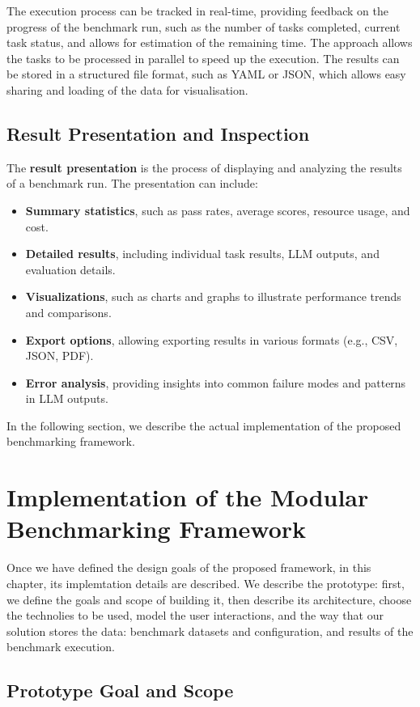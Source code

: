 The execution process can be tracked in real-time, providing feedback on the progress of the benchmark run, such as the number of tasks completed, current task status, and allows for estimation of the remaining time.
The approach allows the tasks to be processed in parallel to speed up the execution.
The results can be stored in a structured file format, such as YAML or JSON, which allows easy sharing and loading of the data for visualisation.

\subsection{Result Presentation and Inspection}
The \textbf{result presentation} is the process of displaying and analyzing the results of a benchmark run.
The presentation can include:
\begin{itemize}
    \item \textbf{Summary statistics}, such as pass rates, average scores, resource usage, and cost.
    \item \textbf{Detailed results}, including individual task results, LLM outputs, and evaluation details.
    \item \textbf{Visualizations}, such as charts and graphs to illustrate performance trends and comparisons.
    \item \textbf{Export options}, allowing exporting results in various formats (e.g., CSV, JSON, PDF).
    \item \textbf{Error analysis}, providing insights into common failure modes and patterns in LLM outputs.
\end{itemize}

In the following section, we describe the actual implementation of the proposed benchmarking framework.

\section{Implementation of the Modular Benchmarking Framework}

Once we have defined the design goals of the proposed framework, in this chapter, its implemtation details are described.
We describe the prototype: first, we define the goals and scope of building it,
then describe its architecture, choose the technolies to be used, model the user interactions,
and the way that our solution stores the data: benchmark datasets and configuration, and results of the benchmark execution.

\subsection{Prototype Goal and Scope}

